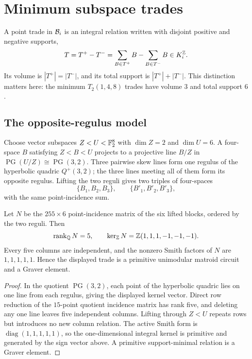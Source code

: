 \section{Minimum subspace trades}
\label{sec:circuits}

A point trade in \(\mathcal B_i\) is an integral relation written with disjoint
positive and negative supports,
\[
  T=T^+-T^-=\sum_{B\in T^+}B-\sum_{B\in T^-}B
  \in K_i^{\mathbb Z}.
\]
Its volume is \(|T^+|=|T^-|\), and its total support is
\(|T^+|+|T^-|\).  This distinction matters here: the minimum
\(T_2(1,4,8)\) trades have volume \(3\) and total support \(6\).

\subsection{The opposite-regulus model}

Choose vector subspaces \(Z<U<\mathbb F_2^8\) with
\(\dim Z=2\) and \(\dim U=6\).  A four-space \(B\) satisfying
\(Z<B<U\) projects to a projective line \(B/Z\) in
\(\operatorname{PG}(U/Z)\cong\operatorname{PG}(3,2)\).
Three pairwise skew lines form one regulus of the hyperbolic quadric
\(Q^+(3,2)\); the three lines meeting all of them form its opposite
regulus.  Lifting the two reguli gives two triples of four-spaces
\[
  \{B_1,B_2,B_3\},
  \qquad
  \{B'_1,B'_2,B'_3\},
\]
with the same point-incidence sum.

\begin{lemma}
\label{lem:regulus-circuit}
Let \(N\) be the \(255\times6\) point-incidence matrix of the six lifted
blocks, ordered by the two reguli.  Then
\[
 \operatorname{rank}_{\mathbb Q}N=5,\qquad
 \ker_{\mathbb Z}N
  =\mathbb Z(1,1,1,-1,-1,-1).
\]
Every five columns are independent, and the nonzero Smith factors of
\(N\) are \(1,1,1,1,1\).  Hence the displayed trade is a primitive
unimodular matroid circuit and a Graver element.
\end{lemma}

\begin{proof}
In the quotient \(\operatorname{PG}(3,2)\), each point of the hyperbolic
quadric lies on one line from each regulus, giving the displayed kernel
vector.  Direct row reduction of the \(15\)-point quotient incidence
matrix has rank five, and deleting any one line leaves five independent
columns.  Lifting through \(Z<U\) repeats rows but introduces no new
column relation.  The active Smith form is
\(\operatorname{diag}(1,1,1,1,1)\), so the one-dimensional integral
kernel is primitive and generated by the sign vector above.  A primitive
support-minimal relation is a Graver element.
\end{proof}

